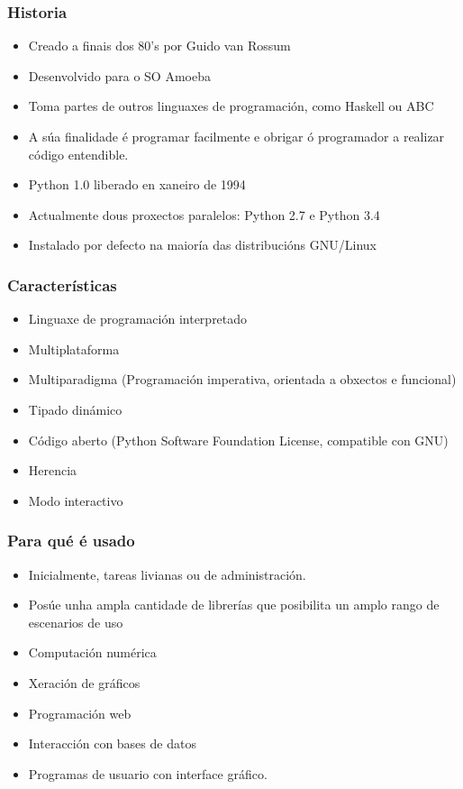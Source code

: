\begin{frame}
  \frametitle{Historia}
  \begin{itemize}
  \item Creado a finais dos 80's por Guido van Rossum
  \item Desenvolvido para o SO Amoeba
  \item Toma partes de outros linguaxes de programación, como Haskell ou ABC
  \item A súa finalidade é programar facilmente e obrigar ó programador a
    realizar código entendible.
  \item Python 1.0 liberado en xaneiro de 1994
  \item Actualmente dous proxectos paralelos: Python 2.7 e Python 3.4
  \item Instalado por defecto na maioría das distribucións GNU/Linux
  \end{itemize}
\end{frame}

\begin{frame}
  \frametitle{Características}
  \begin{itemize}
  \item Linguaxe de programación interpretado
  \item Multiplataforma
  \item Multiparadigma (Programación imperativa, orientada a obxectos e funcional)
  \item Tipado dinámico
  \item Código aberto (Python Software Foundation License, compatible con GNU)
  \item Herencia
  \item Modo interactivo
  \end{itemize}
\end{frame}

\begin{frame}
  \frametitle{Para qué é usado}
  \begin{itemize}
  \item Inicialmente, tareas livianas ou de administración.
  \item Posúe unha ampla cantidade de librerías que posibilita un amplo rango
    de escenarios de uso
  \item Computación numérica
  \item Xeración de gráficos
  \item Programación web
  \item Interacción con bases de datos
  \item Programas de usuario con interface gráfico.
  \end{itemize}
\end{frame}

